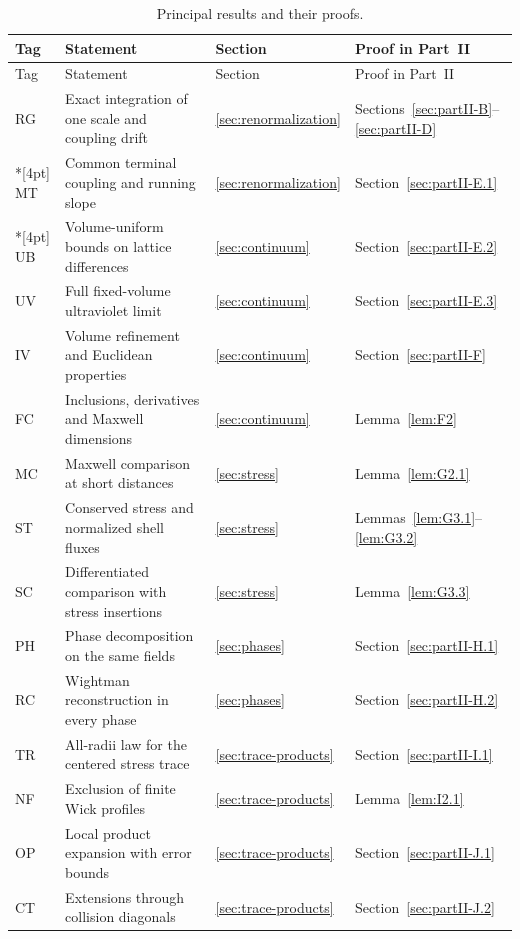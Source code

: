 \begingroup
\setlength{\tabcolsep}{4pt}
\begin{longtable}{@{}p{}p{}p{}p{}@{}}
\caption{Principal results and their proofs.}\label{tab:principal-results}\\
\toprule
Tag & Statement & Section & Proof in Part~II\\
\midrule
\endfirsthead
\toprule
Tag & Statement & Section & Proof in Part~II\\
\midrule
\endhead
\bottomrule
\endfoot
RG & Exact integration of one scale and coupling drift & \ref{sec:renormalization} & Sections~\ref{sec:partII-B}--\ref{sec:partII-D}\\*[4pt]
MT & Common terminal coupling and running slope & \ref{sec:renormalization} & Section~\ref{sec:partII-E.1}\\*[4pt]
UB & Volume-uniform bounds on lattice differences & \ref{sec:continuum} & Section~\ref{sec:partII-E.2}\\[4pt]
UV & Full fixed-volume ultraviolet limit & \ref{sec:continuum} & Section~\ref{sec:partII-E.3}\\[4pt]
IV & Volume refinement and Euclidean properties & \ref{sec:continuum} & Section~\ref{sec:partII-F}\\[4pt]
FC & Inclusions, derivatives and Maxwell dimensions & \ref{sec:continuum} & Lemma~\ref{lem:F2}\\[4pt]
MC & Maxwell comparison at short distances & \ref{sec:stress} & Lemma~\ref{lem:G2.1}\\[4pt]
ST & Conserved stress and normalized shell fluxes & \ref{sec:stress} & Lemmas~\ref{lem:G3.1}--\ref{lem:G3.2}\\[4pt]
SC & Differentiated comparison with stress insertions & \ref{sec:stress} & Lemma~\ref{lem:G3.3}\\[4pt]
PH & Phase decomposition on the same fields & \ref{sec:phases} & Section~\ref{sec:partII-H.1}\\[4pt]
RC & Wightman reconstruction in every phase & \ref{sec:phases} & Section~\ref{sec:partII-H.2}\\[4pt]
TR & All-radii law for the centered stress trace & \ref{sec:trace-products} & Section~\ref{sec:partII-I.1}\\[4pt]
NF & Exclusion of finite Wick profiles & \ref{sec:trace-products} & Lemma~\ref{lem:I2.1}\\[4pt]
OP & Local product expansion with error bounds & \ref{sec:trace-products} & Section~\ref{sec:partII-J.1}\\[4pt]
CT & Extensions through collision diagonals & \ref{sec:trace-products} & Section~\ref{sec:partII-J.2}\\
\end{longtable}
\endgroup

